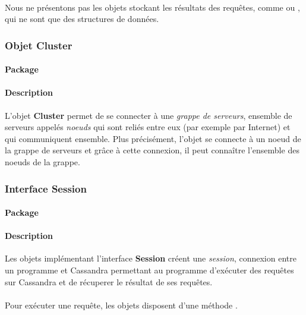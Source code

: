 \documentclass[12pt]{article}
\begin{document}
\paragraph{} Nous ne présentons pas les objets stockant les résultats des requêtes, comme  ou , qui ne sont que des structures de données. 

\subsubsection{Objet Cluster}

\paragraph{Package}  

\paragraph{Description} L'objet \textbf{Cluster} permet de se connecter à une \textit{grappe de serveurs}, ensemble de serveurs appelés \textit{noeuds} qui sont reliés entre eux (par exemple par Internet) et qui communiquent ensemble.
Plus précisément, l'objet se connecte à un noeud de la grappe de serveurs et grâce à cette connexion, il peut connaître l'ensemble des noeuds de la grappe.


\subsubsection{Interface Session}

\paragraph{Package}  

\paragraph{Description} Les objets implémentant l'interface \textbf{Session} créent une \textit{session}, connexion entre un programme et Cassandra permettant au programme d'exécuter des requêtes sur Cassandra et de récuperer le résultat de ses requêtes.

\paragraph{} Pour exécuter une requête, les objets disposent d'une méthode .
\end{document}
